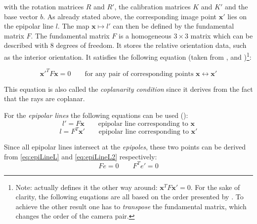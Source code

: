 with the rotation matrices $R$ and $R'$, the calibration matrices $K$ and $K'$ and the base vector $b$. As already stated above, the corresponding image point $\mathbf{x'}$ lies on the epipolar line $l$. The map $\mathbf{x}\mapsto l'$ can then be defined by the fundamental matrix $F$. The fundamental matrix $F$ is a  homogeneous $3\times 3$ matrix which can be described with 8 degrees of freedom. It stores the relative orientation data, such as the interior orientation. It satisfies the following equation (taken from \cite[p.245 et seq.]{Hartley.2011}, \cite[p.2]{Loop.2001} and \cite[p.310]{Luhmann.2014})\footnote{Note: \cite{Luhmann.2014} actually defines it the other way around: $\mathbf{x}^T F \mathbf{x'} =0$. For the sake of clarity, the following euqations are all based on the order presented by \cite{Hartley.2011}. To achieve the other  result one has to \textit{transpose} the fundamental matrix, which changes the order of the camera pair.}: 

\begin{equation}
 \mathbf{x'}^T F \mathbf{x}=0
 \qquad
\text{for any pair of corresponding points } \mathbf{x}\leftrightarrow \mathbf{x'}\label{eq:CoplanarityCondition} 
\end{equation}
 
This equation is also called the \textit{coplanarity condition} since it derives from the fact that the rays are coplanar.

For the \textit{epipolar lines} the following equations can be used (\cite[p.246]{Hartley.2011}):
\begin{equation}
 l' = F\mathbf{x}
 \qquad
\text{epipolar line corresponding to } \mathbf{x}\label{eq:epiLineL2}
\end{equation}
\begin{equation}
 l = F^T\mathbf{x'}
 \qquad
\text{epipolar line corresponding to } \mathbf{x'}\label{eq:epiLineL}
\end{equation}

Since all epipolar lines intersect at the \textit{epipoles}, these two points can be derived from \autoref{eq:epiLineL} and \autoref{eq:epiLineL2} respectively:
\begin{equation}
 Fe = 0
 \qquad
 F^T e' = 0\label{eq:epipoles}
\end{equation}


